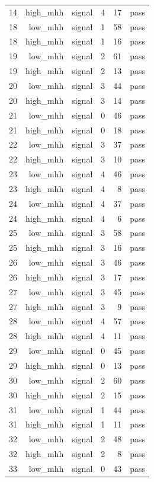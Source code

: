 \begin{table}[htbp]
{\begin{tabular}{lrrrrr}
14 & high\_mhh & signal & 4 & 17 & pass \\
18 & low\_mhh & signal & 1 & 58 & pass \\
18 & high\_mhh & signal & 1 & 16 & pass \\
19 & low\_mhh & signal & 2 & 61 & pass \\
19 & high\_mhh & signal & 2 & 13 & pass \\
20 & low\_mhh & signal & 3 & 44 & pass \\
20 & high\_mhh & signal & 3 & 14 & pass \\
21 & low\_mhh & signal & 0 & 46 & pass \\
21 & high\_mhh & signal & 0 & 18 & pass \\
22 & low\_mhh & signal & 3 & 37 & pass \\
22 & high\_mhh & signal & 3 & 10 & pass \\
23 & low\_mhh & signal & 4 & 46 & pass \\
23 & high\_mhh & signal & 4 & 8 & pass \\
24 & low\_mhh & signal & 4 & 37 & pass \\
24 & high\_mhh & signal & 4 & 6 & pass \\
25 & low\_mhh & signal & 3 & 58 & pass \\
25 & high\_mhh & signal & 3 & 16 & pass \\
26 & low\_mhh & signal & 3 & 46 & pass \\
26 & high\_mhh & signal & 3 & 17 & pass \\
27 & low\_mhh & signal & 3 & 45 & pass \\
27 & high\_mhh & signal & 3 & 9 & pass \\
28 & low\_mhh & signal & 4 & 57 & pass \\
28 & high\_mhh & signal & 4 & 11 & pass \\
29 & low\_mhh & signal & 0 & 45 & pass \\
29 & high\_mhh & signal & 0 & 13 & pass \\
30 & low\_mhh & signal & 2 & 60 & pass \\
30 & high\_mhh & signal & 2 & 15 & pass \\
31 & low\_mhh & signal & 1 & 44 & pass \\
31 & high\_mhh & signal & 1 & 11 & pass \\
32 & low\_mhh & signal & 2 & 48 & pass \\
32 & high\_mhh & signal & 2 & 8 & pass \\
33 & low\_mhh & signal & 0 & 43 & pass \\

\end{tabular}}
\end{table}
